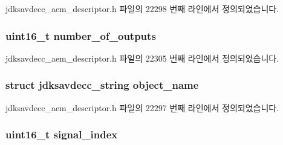 jdksavdecc\+\_\+aem\+\_\+descriptor.\+h 파일의 22298 번째 라인에서 정의되었습니다.

\subsubsection[{\texorpdfstring{number\+\_\+of\+\_\+outputs}{number_of_outputs}}]{\setlength{\rightskip}{0pt plus 5cm}uint16\+\_\+t number\+\_\+of\+\_\+outputs}\hypertarget{structjdksavdecc__descriptor__signal__demultiplexer_acce19609ff3454a0c9b0213591331fa7}{}\label{structjdksavdecc__descriptor__signal__demultiplexer_acce19609ff3454a0c9b0213591331fa7}


jdksavdecc\+\_\+aem\+\_\+descriptor.\+h 파일의 22305 번째 라인에서 정의되었습니다.

\subsubsection[{\texorpdfstring{object\+\_\+name}{object_name}}]{\setlength{\rightskip}{0pt plus 5cm}struct {\bf jdksavdecc\+\_\+string} object\+\_\+name}\hypertarget{structjdksavdecc__descriptor__signal__demultiplexer_a7d1f5945a13863b1762fc6db74fa8f80}{}\label{structjdksavdecc__descriptor__signal__demultiplexer_a7d1f5945a13863b1762fc6db74fa8f80}


jdksavdecc\+\_\+aem\+\_\+descriptor.\+h 파일의 22297 번째 라인에서 정의되었습니다.

\subsubsection[{\texorpdfstring{signal\+\_\+index}{signal_index}}]{\setlength{\rightskip}{0pt plus 5cm}uint16\+\_\+t signal\+\_\+index}\hypertarget{structjdksavdecc__descriptor__signal__demultiplexer_ae2e81a95ee9ad83f1fe22b6a1ee29075}{}\label{structjdksavdecc__descriptor__signal__demultiplexer_ae2e81a95ee9ad83f1fe22b6a1ee29075}


